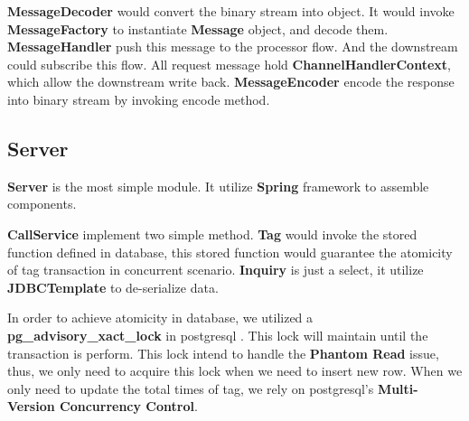 \documentclass{article}
\begin{document}
\textbf{MessageDecoder} would convert the binary stream into object. It would invoke \textbf{MessageFactory} to instantiate \textbf{Message} object, and decode them. \textbf{MessageHandler} push this message to the processor flow. And the downstream could subscribe this flow. All request message hold \textbf{ChannelHandlerContext}, which allow the downstream write back. \textbf{MessageEncoder} encode the response into binary stream by invoking encode method.

\subsection{Server}
\textbf{Server} is the most simple module. It utilize \textbf{Spring} \cite{spring} framework to assemble components.

\textbf{CallService} implement two simple method. \textbf{Tag} would invoke the stored function defined in database, this stored function would guarantee the atomicity of tag transaction in concurrent scenario. \textbf{Inquiry} is just a select, it utilize \textbf{JDBCTemplate} to de-serialize data.

In order to achieve atomicity in database, we utilized a \textbf{pg\_advisory\_xact\_lock} in postgresql \cite{pg}. This lock will maintain until the transaction is perform. This lock intend to handle the \textbf{Phantom Read} issue, thus, we only need to acquire this lock when we need to insert new row. When we only need to update the total times of tag, we rely on postgresql's \textbf{Multi-Version Concurrency Control}.



\end{document}
